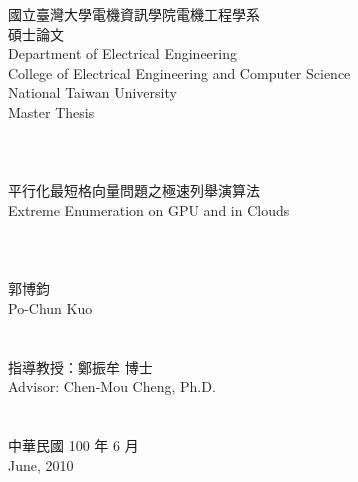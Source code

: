 \documentclass[12pt]{report}
\begin{document}
\onehalfspacing

\begin{titlepage}
\begin{center}

\begin{CJK}{UTF8}{bkai}
\Large{{國立臺灣大學電機資訊學院電機工程學系\\碩士論文}}\\
\large{{Department of Electrical Engineering}}\\
\large{College of Electrical Engineering and Computer Science}\\
\Large{{National Taiwan University}}\\
\Large{{Master Thesis}}\\

\hspace*{1cm}~\\
\hspace*{1cm}~\\
\hspace*{1cm}~\\
\Large{平行化最短格向量問題之極速列舉演算法\\
Extreme Enumeration on GPU and in Clouds }\\
\hspace*{1cm}~\\
\hspace*{1cm}~\\
\hspace*{1cm}~\\

\Large{郭博鈞\\Po-Chun Kuo}\\
\hspace*{1cm}~\\
\hspace*{1cm}~\\

\Large{指導教授：鄭振牟 博士\\Advisor: Chen-Mou Cheng, Ph.D.}\\
\hspace*{1cm}~\\
\hspace*{1cm}~\\


\Large{中華民國 100 年 6 月\\June, 2010}\\

\end{CJK}
\end{center}
\end{titlepage}
\end{document}
